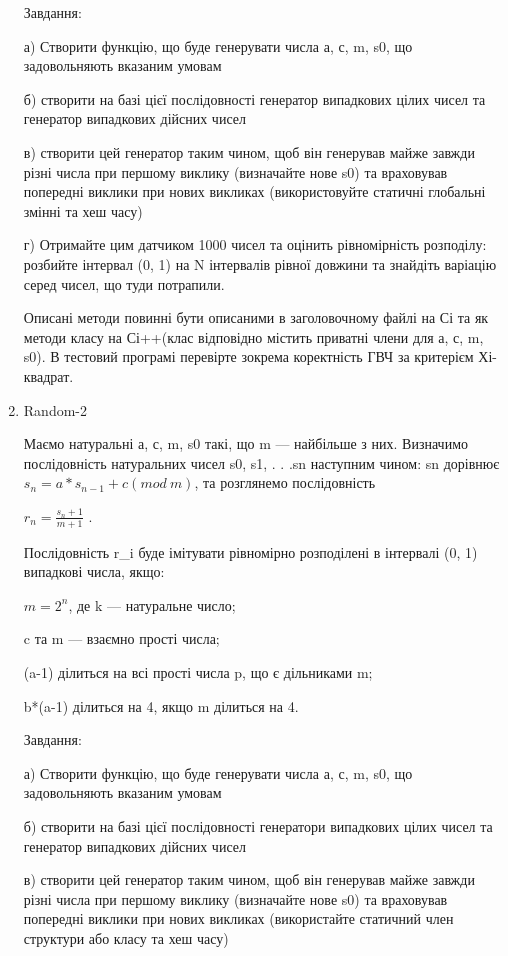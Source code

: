 \documentclass[]{article}
\begin{document}
\begin{enumerate}
Завдання:

а) Створити функцію, що буде генерувати числа а, с, m, s0, що
задовольняють вказаним умовам

б) створити на базі цієї послідовності генератор випадкових цілих чисел
та генератор випадкових дійсних чисел

в) створити цей генератор таким чином, щоб він генерував майже завжди
різні числа при першому виклику (визначайте нове s0) та враховував
попередні виклики при нових викликах (використовуйте статичні глобальні
змінні та хеш часу)

г) Отримайте цим датчиком 1000 чисел та оцінить рівномірність розподілу:
розбийте інтервал (0, 1) на N інтервалів рівної довжини та знайдіть
варіацію серед чисел, що туди потрапили.

Описані методи повинні бути описаними в заголовочному файлі на Сі та як
методи класу на Сі++(клас відповідно містить приватні члени для а, с, m,
s0). В тестовий програмі перевірте зокрема коректність ГВЧ за критерієм
Хі-квадрат.

\item
Random-2

Маємо натуральні а, с, m, s0 такі, що m --- найбільше з них. Визначимо
послідовність натуральних чисел s0, s1, . . .sn наступним чином: sn
дорівнює \(s_{n} = a*s_{n - 1} + c(mod\ m)\), та розглянемо
послідовність

\(r_{n} = \frac{s_{n} + 1}{m + 1}\) .

Послідовність r\_i буде імітувати рівномірно розподілені в інтервалі (0,
1) випадкові числа, якщо:

\({m = 2}^{n}\), де k --- натуральне число;

c та m --- взаємно прості числа;

(a-1) ділиться на всі прості числа p, що є дільниками m;

b*(a-1) ділиться на 4, якщо m ділиться на 4.

Завдання:

а) Створити функцію, що буде генерувати числа а, с, m, s0, що
задовольняють вказаним умовам

б) створити на базі цієї послідовності генератори випадкових цілих чисел
та генератор випадкових дійсних чисел

в) створити цей генератор таким чином, щоб він генерував майже завжди
різні числа при першому виклику (визначайте нове s0) та враховував
попередні виклики при нових викликах (використайте статичний член
структури або класу та хеш часу)


\end{enumerate}
\end{document}

